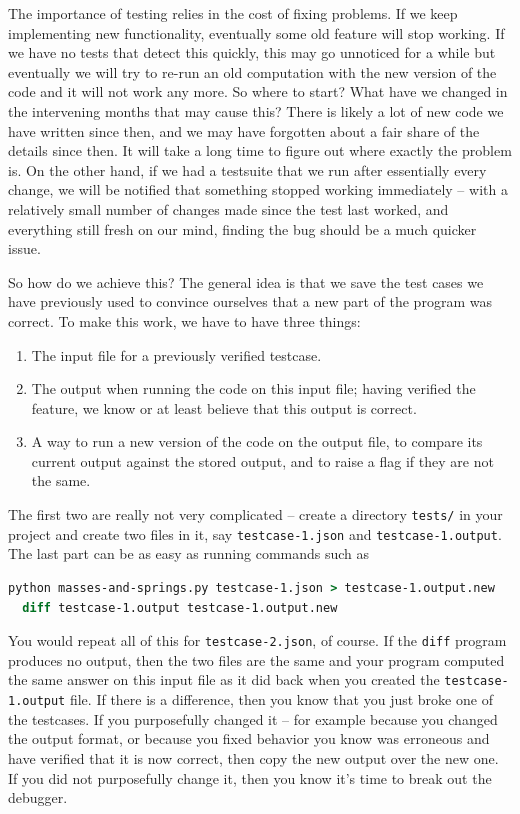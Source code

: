 \documentclass{article}
\begin{document}
The importance of testing relies in the cost of fixing problems. If we keep
implementing new functionality, eventually some old feature will stop
working. If we have no tests that detect this quickly, this may go unnoticed
for a while but eventually we will try to re-run an old computation with the
new version of the code and it will not work any more. So where to start? What
have we changed in the intervening months that may cause this? There is likely
a lot of new code we have written since then, and we may have forgotten about
a fair share of the details since then. It will take a long time to figure out
where exactly the problem is. On the other hand, if we had a testsuite that we
run after essentially every change, we will be notified that something stopped
working immediately -- with a relatively small number of changes made since
the test last worked, and everything still fresh on our mind, finding the bug
should be a much quicker issue.

So how do we achieve this? The general idea is that we save the test cases we
have previously used to convince ourselves that a new part of the program was
correct. To make this work, we have to have three things:
\begin{enumerate}
\item The input file for a previously verified testcase.
\item The output when running the code on this input file; having verified the
  feature, we know or at least believe that this output is correct.
\item A way to run a new version of the code on the output file, to compare
  its current output against the stored output, and to raise a flag if they
  are not the same.
\end{enumerate}
The first two are really not very complicated -- create a directory
\texttt{tests/} in your project and create two files in it, say
\texttt{testcase-1.json} and \texttt{testcase-1.output}. The last part can
be as easy as running commands such as
\begin{lstlisting}[frame=single,basicstyle=\footnotesize,language=csh]
  python masses-and-springs.py testcase-1.json > testcase-1.output.new
  diff testcase-1.output testcase-1.output.new
\end{lstlisting}
You would repeat all of this for \texttt{testcase-2.json}, of course.
If the \texttt{diff} program produces no output, then the two files are the
same and your program computed the same answer on this input file as it did
back when you created the \texttt{testcase-1.output} file. If there is a
difference, then you know that you just broke one of the testcases. If you
purposefully changed it -- for example because you changed the output format,
or because you fixed behavior you know was erroneous and have verified that it
is now correct, then copy the new output over the new one. If you did not
purposefully change it, then you know it's time to break out the debugger.
\end{document}
